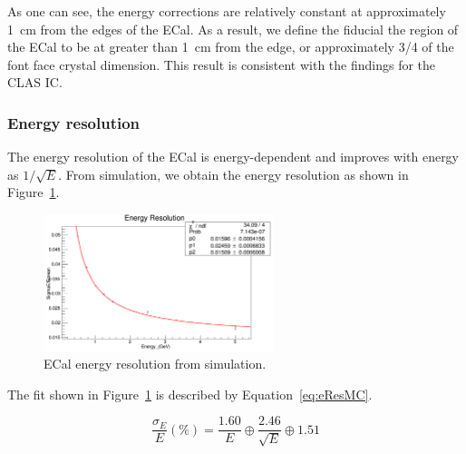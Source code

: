 As one can see, the energy corrections are relatively constant at approximately 1~cm from the edges of the ECal. As a result, we define the fiducial the region of the ECal to be at greater than 1~cm from the edge, or approximately 3/4 of the font face crystal dimension. This result is consistent with the findings for the CLAS IC.~\cite{szumila-vance_hps_ecal_2014} 

\subsubsection{Energy resolution}

The energy resolution of the ECal is energy-dependent and improves with energy as $1/\sqrt{E}$. From simulation, we obtain the energy resolution as shown in Figure~\ref{Figure:eResFitMC}.

\begin{figure}[H]
  \centering
      \includegraphics[width=0.6\textwidth]{pics/performance/eResFitMC.png}
  \caption[ECal energy resolution fitted from simulation]{ECal energy resolution from simulation.}
  \label{Figure:eResFitMC}
\end{figure}

The fit shown in Figure~\ref{Figure:eResFitMC} is described by Equation~\ref{eq:eResMC}.

\begin{equation}
\label{eq:eResMC}
\dfrac{\sigma_E}{E} (\%) = \dfrac{1.60}{E} \oplus \dfrac{2.46}{\sqrt{E}} \oplus 1.51
\end{equation}

